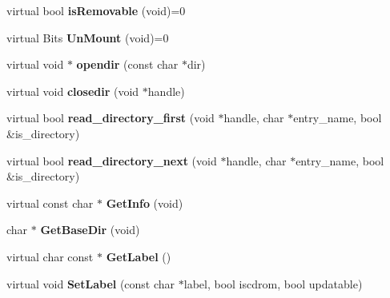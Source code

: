 \begin{DoxyCompactItemize}
\item 
\hypertarget{classDOS__Drive_a6931988116a287679e700e30083ec9de}{virtual bool {\bfseries is\-Removable} (void)=0}\label{classDOS__Drive_a6931988116a287679e700e30083ec9de}

\item 
\hypertarget{classDOS__Drive_aef7bc7c1cbf09e4fe88ee8bc7435db07}{virtual Bits {\bfseries Un\-Mount} (void)=0}\label{classDOS__Drive_aef7bc7c1cbf09e4fe88ee8bc7435db07}

\item 
\hypertarget{classDOS__Drive_ae382ad86607e9926893e78af7231ec61}{virtual void $\ast$ {\bfseries opendir} (const char $\ast$dir)}\label{classDOS__Drive_ae382ad86607e9926893e78af7231ec61}

\item 
\hypertarget{classDOS__Drive_af52e4214f17f23c70751df925582ba12}{virtual void {\bfseries closedir} (void $\ast$handle)}\label{classDOS__Drive_af52e4214f17f23c70751df925582ba12}

\item 
\hypertarget{classDOS__Drive_ac595d4546118da9910b2f736b7af1c41}{virtual bool {\bfseries read\-\_\-directory\-\_\-first} (void $\ast$handle, char $\ast$entry\-\_\-name, bool \&is\-\_\-directory)}\label{classDOS__Drive_ac595d4546118da9910b2f736b7af1c41}

\item 
\hypertarget{classDOS__Drive_aaf4039f2a7830fab1b0c8603542f9f31}{virtual bool {\bfseries read\-\_\-directory\-\_\-next} (void $\ast$handle, char $\ast$entry\-\_\-name, bool \&is\-\_\-directory)}\label{classDOS__Drive_aaf4039f2a7830fab1b0c8603542f9f31}

\item 
\hypertarget{classDOS__Drive_a8ef29c06b85c584f74eaa574d37a86f1}{virtual const char $\ast$ {\bfseries Get\-Info} (void)}\label{classDOS__Drive_a8ef29c06b85c584f74eaa574d37a86f1}

\item 
\hypertarget{classDOS__Drive_a711703de0138c7b7c0f15dfc3a1d9dc5}{char $\ast$ {\bfseries Get\-Base\-Dir} (void)}\label{classDOS__Drive_a711703de0138c7b7c0f15dfc3a1d9dc5}

\item 
\hypertarget{classDOS__Drive_a8e239d9aa134597f38505b39b8ca8016}{virtual char const $\ast$ {\bfseries Get\-Label} ()}\label{classDOS__Drive_a8e239d9aa134597f38505b39b8ca8016}

\item 
\hypertarget{classDOS__Drive_a20d9aa48e274a59070f10d949802a4b2}{virtual void {\bfseries Set\-Label} (const char $\ast$label, bool iscdrom, bool updatable)}\label{classDOS__Drive_a20d9aa48e274a59070f10d949802a4b2}


\end{DoxyCompactItemize}
